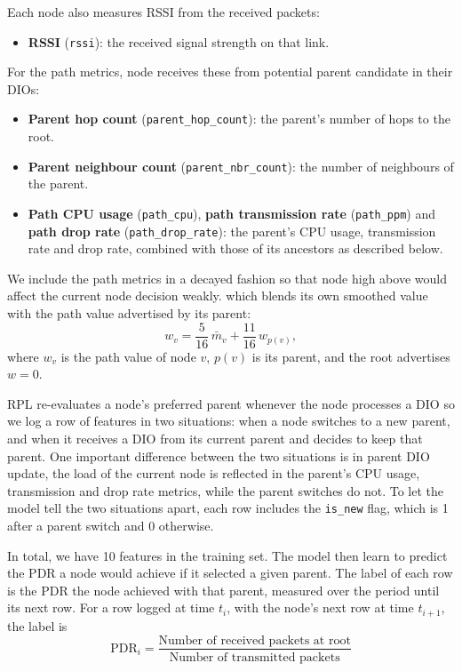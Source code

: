 Each node also measures RSSI from the received packets:
\begin{itemize}
    \item \textbf{RSSI} (\texttt{rssi}): the received signal strength
        on that link.
\end{itemize}

For the path metrics, node receives these from potential parent
candidate in their DIOs:
\begin{itemize}
    \item \textbf{Parent hop count} (\texttt{parent\_hop\_count}): the parent's
        number of hops to the root.
    \item \textbf{Parent neighbour count}
        (\texttt{parent\_nbr\_count}): the number
        of neighbours of the parent.
    \item \textbf{Path CPU usage} (\texttt{path\_cpu}), \textbf{path
        transmission rate} (\texttt{path\_ppm}) and \textbf{path drop
        rate} (\texttt{path\_drop\_rate}): the parent's CPU usage,
        transmission rate and drop rate, combined with those of its
        ancestors as described below.
\end{itemize}

We include the path metrics in a decayed fashion so that node high
above would affect the current node decision weakly.
which blends its own smoothed value with the path
value advertised by its parent:
\begin{equation}
    w_v = \frac{5}{16}\,\bar{m}_v + \frac{11}{16}\,w_{p(v)},
\end{equation}
where $w_v$ is the path value of node $v$, $p(v)$ is its parent, and
the root advertises $w = 0$.

RPL re-evaluates a node's preferred parent whenever the node processes
a DIO so we log a row of features in two situations: when a
node switches to a new parent, and when it receives a DIO from its
current parent and decides to keep that parent. One important
difference between the two situations is in parent DIO update, the
load of the current node is reflected in the parent's CPU usage,
transmission and drop rate metrics, while the parent switches do not.
To let the model tell the two situations apart, each row includes the
\texttt{is\_new} flag, which is 1 after a parent switch and 0
otherwise.

In total, we have 10 features in the training set. The model then
learn to predict the PDR a node would achieve if it selected
a given parent. The label of each row is the PDR the node
achieved with that parent, measured over the period until
its next row. For a row logged at time $t_i$, with the node's next
row at time $t_{i+1}$, the label is
\begin{equation}
    \mathrm{PDR}_i = \frac{\text{Number of received packets at
    root}}{\text{Number of transmitted packets}}
\end{equation}

